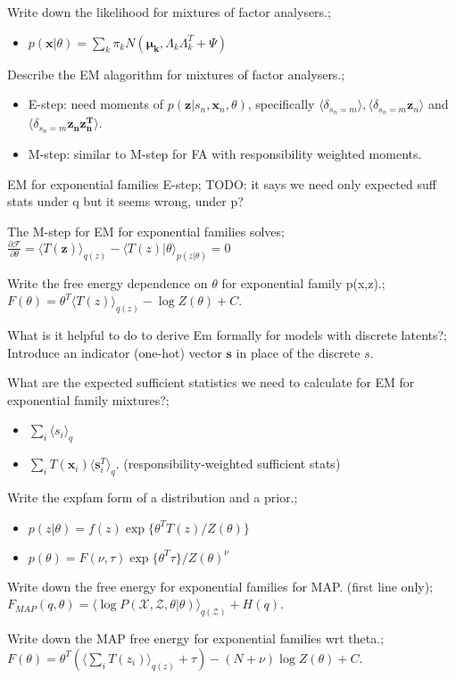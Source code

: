 \documentclass{article}
\begin{document}
Write down the likelihood for mixtures of factor analysers.; \begin{itemize}
    \item $p(\mathbf{x}|\theta) = \sum_k \pi_k N(\mathbf{\mu_k}, \Lambda_k\Lambda_k^T + \Psi)$
\end{itemize}

Describe the EM alagorithm for mixtures of factor analysers.; \begin{itemize}
    \item E-step: need moments of $p(\mathbf{z}|s_n, \mathbf{x}_n, \theta)$, specifically $\langle \delta_{s_n=m}\rangle, \langle\delta_{s_n=m}\mathbf{z}_n\rangle$ and $\langle \delta_{s_n=m}\mathbf{z_nz_n^T}\rangle$.
    \item M-step: similar to M-step for FA with responsibility weighted moments.
\end{itemize}

EM for exponential families E-step; TODO: it says we need only expected suff stats under q but it seems wrong, under p?

The M-step for EM for exponential families solves; $\frac{\partial \mathcal{F}}{\partial \theta}= \langle T(\mathbf{z})\rangle_{q(z)} - \langle T(z)|\theta \rangle_{p(z|\theta)} = 0$

Write the free energy dependence on $\theta$ for exponential family p(x,z).; $F(\theta) = \theta^T\langle T(z) \rangle_{q(z)} - \log Z(\theta) + C$.

What is it helpful to do to derive Em formally for models with discrete latents?; Introduce an indicator (one-hot) vector $\mathbf{s}$ in place of the discrete $s$.

What are the expected sufficient statistics we need to calculate for EM for exponential family mixtures?; \begin{itemize}
    \item $\sum_i \langle s_i \rangle_{q}$
    \item $\sum_i T(\mathbf{x}_i)\langle \mathbf{s}_i^T \rangle_q$. (responsibility-weighted sufficient stats)
\end{itemize}

Write the expfam form of a distribution and a prior.; \begin{itemize}
    \item $p(z|\theta) = f(z)\exp\{\theta^T T(z)/Z(\theta)\}$
    \item $p(\theta) = F(\nu, \tau)\exp\{\theta^T\tau\}/Z(\theta)^\nu$
\end{itemize}

Write down the free energy for exponential families for MAP. (first line only);  $F_{MAP}(q,\theta) = \langle \log P(\mathcal{X, Z, \theta}|\theta)\rangle_{q(\mathcal{Z})}+H(q)$.

Write down the MAP free energy for exponential families wrt theta.;  $F(\theta) = \theta^T(\langle \sum_i T(z_i) \rangle_{q(z)} + \tau)- (N+\nu) \log Z(\theta) + C$.
\end{document}
